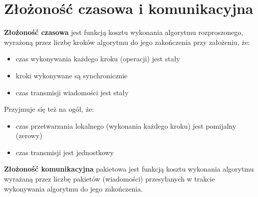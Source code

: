 \documentclass[11pt]{article}
\begin{document}
\section{Złożoność czasowa i komunikacyjna}
\textbf{Złożoność czasowa} jest funkcją kosztu wykonania algorytmu rozproszonego, wyrażoną przez liczbę kroków algorytmu do jego zakończenia przy założeniu, że:
\begin{itemize}
\item czas wykonywania każdego kroku (operacji) jest stały
\item kroki wykonywane są synchronicznie
\item czas transmisji wiadomości jest stały
\end{itemize}
Przyjmuje się też na ogół, że:
\begin{itemize}
\item czas przetwarzania lokalnego (wykonania każdego kroku) jest pomijalny (zerowy)
\item czas transmisji jest jednostkowy
\end{itemize}
\medskip 
\textbf{Złożoność komunikacyjna} pakietowa jest funkcją kosztu wykonania algorytmu wyrażaną przez liczbę pakietów (wiadomości) przesyłanych w trakcie wykonywania algorytmu do jego zakończenia.

\newpage
\end{document}
